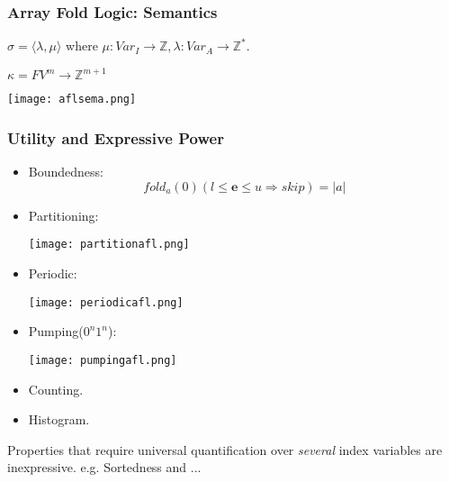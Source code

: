 \documentclass[11pt]{beamer}
\begin{document}
\begin{frame}\frametitle{Array Fold Logic: Semantics}
$\sigma = \langle\lambda, \mu\rangle$ where $\mu: Var_{I} \rightarrow \mathbb{Z}, \lambda: Var_{A} \rightarrow \mathbb{Z}^*$.

$\kappa = FV^{m} \rightarrow \mathbb{Z}^{m+1}$
\begin{center}
\texttt{[image: aflsema.png]}
\end{center}

\end{frame}

\iffalse
\begin{frame}\frametitle{Utility and Expressive Power}
\begin{itemize}
\item Boundedness:
\[fold_a(0)(l\le \textbf{e} \le u \Rightarrow skip) = |a|\]
\item Partitioning:
\begin{center}
\texttt{[image: partitionafl.png]}
\end{center}
\item Periodic:
\begin{center}
\texttt{[image: periodicafl.png]}
\end{center}
\item Pumping($0^n1^n$):
\begin{center}
\texttt{[image: pumpingafl.png]}
\end{center}
\item Counting.
\item Histogram.
\end{itemize}
Properties that require universal quantification over \textit{several} index variables are inexpressive.
e.g. Sortedness and ...
 \end{frame}
 
\end{document}
